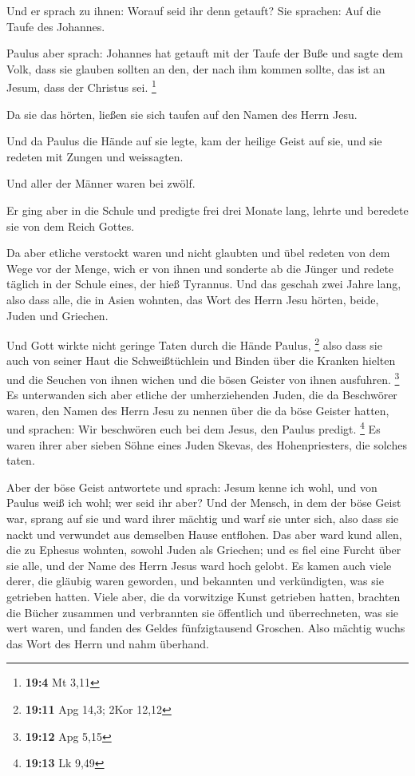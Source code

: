  Und er sprach zu ihnen: Worauf seid ihr denn getauft? Sie
sprachen: Auf die Taufe des Johannes.

 Paulus aber sprach: Johannes hat getauft mit der Taufe
der Buße und sagte dem Volk, dass sie glauben sollten an den, der nach
ihm kommen sollte, das ist an Jesum, dass der Christus sei. \footnote{\textbf{19:4}
  Mt 3,11}

 Da sie das hörten, ließen sie sich taufen auf den Namen
des Herrn Jesu.

 Und da Paulus die Hände auf sie legte, kam der heilige
Geist auf sie, und sie redeten mit Zungen und weissagten.

 Und aller der Männer waren bei zwölf.

 Er ging aber in die Schule und predigte frei drei Monate
lang, lehrte und beredete sie von dem Reich Gottes.

 Da aber etliche verstockt waren und nicht glaubten und
übel redeten von dem Wege vor der Menge, wich er von ihnen und sonderte
ab die Jünger und redete täglich in der Schule eines, der hieß Tyrannus.
 Und das geschah zwei Jahre lang, also dass alle, die in
Asien wohnten, das Wort des Herrn Jesu hörten, beide, Juden und
Griechen.

 Und Gott wirkte nicht geringe Taten durch die Hände
Paulus, \footnote{\textbf{19:11} Apg 14,3; 2Kor 12,12} 
also dass sie auch von seiner Haut die Schweißtüchlein und Binden über
die Kranken hielten und die Seuchen von ihnen wichen und die bösen
Geister von ihnen ausfuhren. \footnote{\textbf{19:12} Apg 5,15}
 Es unterwanden sich aber etliche der umherziehenden
Juden, die da Beschwörer waren, den Namen des Herrn Jesu zu nennen über
die da böse Geister hatten, und sprachen: Wir beschwören euch bei dem
Jesus, den Paulus predigt. \footnote{\textbf{19:13} Lk 9,49}
 Es waren ihrer aber sieben Söhne eines Juden Skevas, des
Hohenpriesters, die solches taten.

 Aber der böse Geist antwortete und sprach: Jesum kenne
ich wohl, und von Paulus weiß ich wohl; wer seid ihr aber?
 Und der Mensch, in dem der böse Geist war, sprang auf
sie und ward ihrer mächtig und warf sie unter sich, also dass sie nackt
und verwundet aus demselben Hause entflohen.  Das aber
ward kund allen, die zu Ephesus wohnten, sowohl Juden als Griechen; und
es fiel eine Furcht über sie alle, und der Name des Herrn Jesus ward
hoch gelobt.  Es kamen auch viele derer, die gläubig
waren geworden, und bekannten und verkündigten, was sie getrieben
hatten.  Viele aber, die da vorwitzige Kunst getrieben
hatten, brachten die Bücher zusammen und verbrannten sie öffentlich und
überrechneten, was sie wert waren, und fanden des Geldes fünfzigtausend
Groschen.  Also mächtig wuchs das Wort des Herrn und nahm
überhand.

